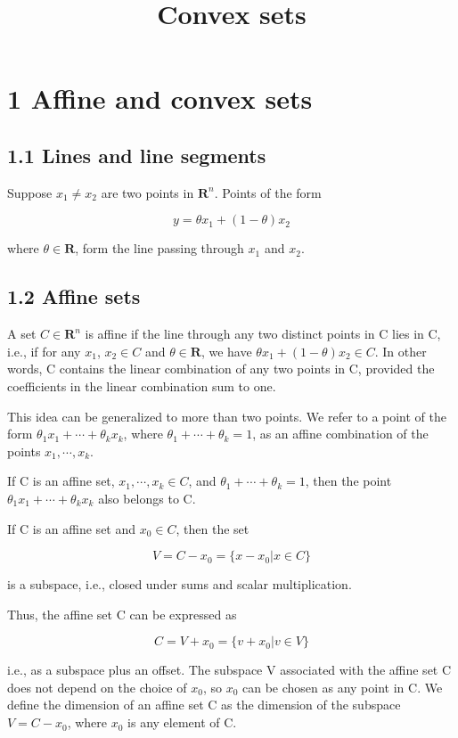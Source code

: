 \documentclass{article}
\title{Convex sets}
\begin{document}
\maketitle

\section*{1 Affine and convex sets}

\subsection*{1.1 Lines and line segments}

Suppose $x_1\ne x_2$ are two points in $\mathbf{R}^n$. Points of the form

\[
y=\theta x_1+(1-\theta)x_2    
\]

where $\theta\in \mathbf{R}$, form the line passing through $x_1$ and $x_2$.

\subsection*{1.2 Affine sets}

A set $C\in \mathbf{R}^n$ is affine if the line through any two distinct points in C lies in C,
i.e., if for any $x_1$, $x_2\in C$ and $\theta\in \mathbf{R}$, we have $\theta x_1 +(1-\theta)x_2\in C$. In other words,
C contains the linear combination of any two points in C, provided the coefficients
in the linear combination sum to one.

This idea can be generalized to more than two points. We refer to a point
of the form $\theta_1x_1+\cdots+\theta_kx_k$, where $\theta_1+\cdots+\theta_k=1$, as an affine combination
of the points $x_1,\cdots,x_k$.

If C is an affine set, $x_1,\cdots,x_k\in C$, and $\theta_1+\cdots+\theta_k=1$, then the point $\theta_1x_1+\cdots+\theta_kx_k$ also belongs
to C.

If C is an affine set and $x_0\in C$, then the set

\[
V=C-x_0=\{x-x_0|x\in C\}    
\]

is a subspace, i.e., closed under sums and scalar multiplication.

Thus, the affine set C can be expressed as

\[
C=V+x_0=\{v+x_0|v\in V\}    
\]

i.e., as a subspace plus an offset. The subspace V associated with the affine set C
does not depend on the choice of $x_0$, so $x_0$ can be chosen as any point in C. We
define the dimension of an affine set C as the dimension of the subspace $V=C-x_0$,
where $x_0$ is any element of C.
\end{document}
